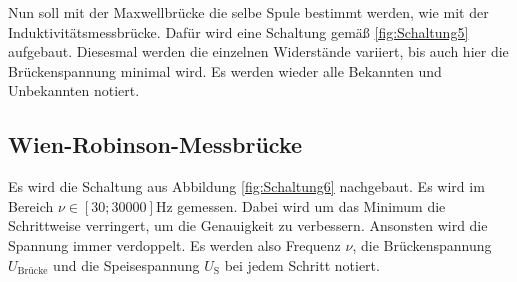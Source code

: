Nun soll mit der Maxwellbrücke die selbe Spule bestimmt werden, wie mit der Induktivitätsmessbrücke.
Dafür wird eine Schaltung gemäß \ref{fig:Schaltung5} aufgebaut.
Diesesmal werden die einzelnen Widerstände variiert, bis auch hier die 
Brückenspannung minimal wird.
Es werden wieder alle Bekannten und Unbekannten notiert.

\subsection{Wien-Robinson-Messbrücke}

Es wird die Schaltung aus Abbildung \ref{fig:Schaltung6} nachgebaut.
Es wird im Bereich $\nu \in \left[ 30 ;30000 \right] \si\hertz $ gemessen.
Dabei wird um das Minimum die Schrittweise verringert, um die Genauigkeit zu verbessern.
Ansonsten wird die Spannung immer verdoppelt.
Es werden also Frequenz $\nu$, die Brückenspannung $U_\text{Brücke}$ und die Speisespannung $U_\text{S}$
bei jedem Schritt notiert.
